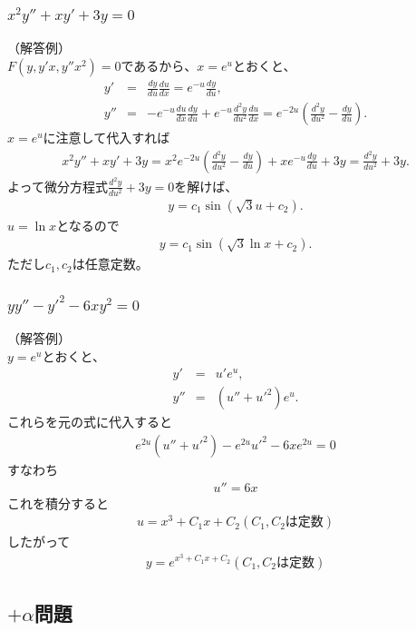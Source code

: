 \documentclass[a4paper,11pt,fleqn]{jarticle}
\begin{document}
\subsubsection{$x^2y''+xy'+3y=0$}
（解答例）\\
$F(y,y'x,y''x^2) = 0$であるから、$x = e^u$とおくと、
\begin{eqnarray*}
y' &=& \frac{dy}{du} \frac{du}{dx} = e^{-u}\frac{dy}{du},\\
y'' &=& -e^{-u}\frac{du}{dx}\frac{dy}{du} + e^{-u}\frac{d^2y}{du^2}\frac{du}{dx}
=e^{-2u}\left(\frac{d^2y}{du^2}-\frac{dy}{du}\right).
\end{eqnarray*}
$x = e^u$に注意して代入すれば
\begin{eqnarray*}
x^2y''+xy'+3y = x^2e^{-2u}\left(\frac{d^2y}{du^2}-\frac{dy}{du}\right) + xe^{-u}\frac{dy}{du} + 3y = \frac{d^2y}{du^2} + 3y.
\end{eqnarray*}
よって微分方程式$\frac{d^2y}{du^2} + 3y = 0$を解けば、
\begin{eqnarray*}
y = c_1\sin(\sqrt{3}u + c_2) .
\end{eqnarray*}
$u=\ln x$となるので
\begin{eqnarray*}
y = c_1\sin(\sqrt{3}\ln x + c_2) .
\end{eqnarray*}
ただし$c_1,c_2$は任意定数。

\subsubsection{$yy''-{y'}^2-6xy^2=0$}
（解答例）\\
$y = e^u$とおくと、
\begin{eqnarray*}
y' &=& u'e^{u},\\
y'' &=& (u''+u'^{2})e^{u}.
\end{eqnarray*}
これらを元の式に代入すると
\begin{eqnarray*}
e^{2u}(u''+u'^{2})-e^{2u}u'^{2}-6xe^{2u}=0
\end{eqnarray*}
すなわち
\begin{eqnarray*}
u''=6x
\end{eqnarray*}
これを積分すると
\begin{eqnarray*}
u=x^{3}+C_{1}x+C_{2} (C_{1},C_{2}は定数)
\end{eqnarray*}
したがって
\begin{eqnarray*}
y=e^{x^{3}+C_{1}x+C_{2} }(C_{1},C_{2}は定数)
\end{eqnarray*}

\newpage
\subsection{$+\alpha$問題}
\end{document}
